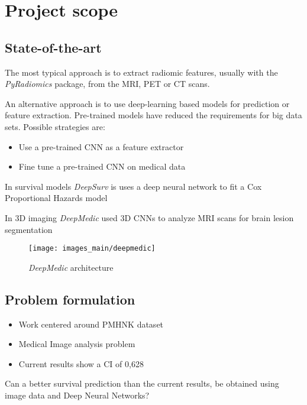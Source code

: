 
\section{Project scope}
\subsection{State-of-the-art}
\begin{frame}{\insertsubsec}
  The most typical approach is to extract radiomic features, usually with
  the \emph{PyRadiomics} package, from the MRI, PET or CT scans.

  \vspace{.5cm}
  An alternative approach is to use deep-learning based models for prediction or 
  feature extraction. Pre-trained models have reduced the requirements for big data sets.
  Possible strategies are:
  \begin{itemize}
    \item Use a pre-trained CNN as a feature extractor
    \item Fine tune a pre-trained CNN on medical data
  \end{itemize}
  \vspace{.5cm}
  In survival models \emph{DeepSurv} is uses a deep neural network to fit a Cox Proportional 
  Hazards model
\end{frame}

\begin{frame}
  In 3D imaging \emph{DeepMedic} used 3D CNNs to analyze MRI scans for brain lesion segmentation

  \vspace{.5cm}
  \begin{figure}
    \centering
    \texttt{[image: images\_main/deepmedic]}
    \caption{\emph{DeepMedic} architecture}
  \end{figure}
\end{frame}

\subsection{Problem formulation}
\begin{frame}{\insertsubsec}

  \begin{itemize}
    \item Work centered around PMHNK dataset
    \item Medical Image analysis problem
    \item Current results show a CI of 0,628
  \end{itemize}
  
  Can a better survival prediction than the current results, be obtained using image
  data and Deep Neural Networks?
\end{frame}

